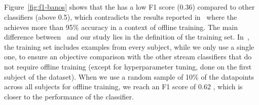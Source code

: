 \subsection{\FNN}

Figure~\ref{fig:f1-banos} shows that the \FNN has a low F1 score (0.36)
compared to other classifiers (above 0.5), which contradicts the results
reported in~\cite{omid_2019} where the \FNN achieves more than 95\%
accuracy in a context of offline training. The main difference
between~\cite{omid_2019} and our study lies in the definition of the
training set. In~\cite{omid_2019}, the training set includes examples from
every subject, while we only use a single one, to ensure an objective
comparison with the other stream classifiers that do not require offline
training (except for hyperparameter tuning, done on the first subject of
the \banosdataset dataset). When we use a random sample of 10\% of the
datapoints across all subjects for offline training, we reach an F1 score
of 0.62 , which is closer to the performance of the
\naivebayes classifier.


